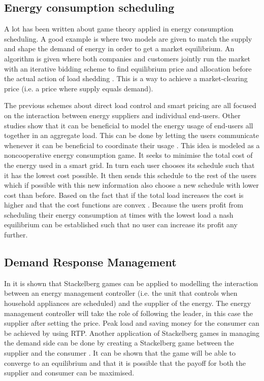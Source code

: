 \subsection{Energy consumption scheduling}
A lot has been written about game theory applied in energy consumption scheduling. A good example is \cite{ChenLiLowEtAl2010} where two models are given to match the supply and shape the demand of energy in order to get a market equilibrium. An algorithm is given where both companies and customers jointly run the market with an iterative bidding scheme to find equilibrium price and allocation before the actual action of load shedding \cite{ChenLiLowEtAl2010}. This is a way to achieve a market-clearing price (i.e. a price where supply equals demand).

The previous schemes about direct load control and smart pricing are all focused on the interaction between energy suppliers and individual end-users. Other studies show \cite{Mohsenian-RadWongJatskevichEtAl2010a} that it can be beneficial to model the energy usage of end-users all together in an aggregate load. This can be done by letting the users communicate whenever it can be beneficial to coordinate their usage \cite{Mohsenian-RadWongJatskevichEtAl2010a}. This idea is modeled as a noncooperative energy consumption game. It seeks to minimise the total cost of the energy used in a smart grid. In turn each user chooses its schedule such that it has the lowest cost possible. It then sends this schedule to the rest of the users which if possible with this new information also choose a new schedule with lower cost than before. Based on the fact that if the total load increases the cost is higher and that the cost functions are convex \cite{Mohsenian-RadLeon-Garcia2010}. Because the users profit from scheduling their energy consumption at times with the lowest load a nash equilibrium can be established such that no user can increase its profit any further.


\subsection{Demand Response Management}
In \cite{ChenKishoreSnyder2011} it is shown that Stackelberg games can be applied to modelling the interaction between an energy management controller (i.e. the unit that controls when household appliances are scheduled) and the supplier of the energy. The energy management controller will take the role of following the leader, in this case the supplier after setting the price. Peak load and saving money for the consumer can be achieved by using RTP. Another application of Stackelberg games in managing the demand side can be done by creating a Stackelberg game between the supplier and the consumer \cite{MaharjanZhuZhangEtAl2013}. It can be shown that the game will be able to converge to an equilibrium and that it is possible that the payoff for both the supplier and consumer can be maximised. 


